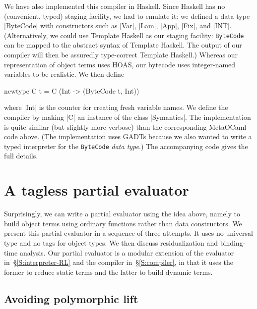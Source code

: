 We have also implemented this compiler in Haskell. 
Since Haskell
has no (convenient, typed) staging facility, we had to emulate
it: we defined a data type |ByteCode| with
constructors such as |Var|, |Lam|, |App|, |Fix|, and |INT|.
(Alternatively, we could use Template Haskell as our staging facility:
\texttt{ByteCode} can be mapped to the abstract syntax of Template
Haskell. The output of our compiler will then be assuredly type-correct
Template Haskell.)
Whereas our representation of object terms uses HOAS,
our bytecode uses integer-named
variables to be realistic. 
We then define 
\begin{code}
newtype C t = C (Int -> (ByteCode t, Int)) 
\end{code}
where |Int| is the counter for creating fresh variable
names. We define the compiler by making |C| an instance of the
class |Symantics|.
The implementation is quite similar (but slightly more
verbose) than the corresponding MetaOCaml code above. (The implementation uses
GADTs because we also wanted to write a typed interpreter for 
the \texttt{ByteCode} \emph{data type}.) The
accompanying code gives the full details.
\fi

\ifshort

\else

\section{A tagless partial evaluator}\label{PE}
Surprisingly, we can write a partial evaluator using the idea above,
namely to build object terms using ordinary functions rather than data
constructors.  We present this partial evaluator in a sequence of three
attempts. It uses no universal type and no tags
for object types.  We then discuss residualization and binding-time
analysis.  Our partial evaluator is a modular extension of the evaluator
in~\S\ref{S:interpreter-RL} and the compiler in~\S\ref{S:compiler}, in
that it uses the former to reduce static terms and the latter to build
dynamic terms.

\subsection{Avoiding polymorphic lift}
\label{S:PE-lift}


